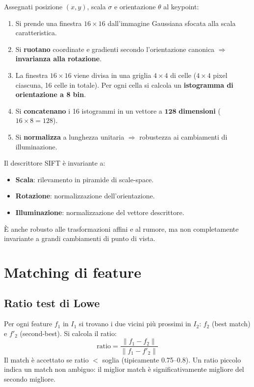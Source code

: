 \documentclass[12pt, a4paper]{report}
\begin{document}
Assegnati posizione $(x,y)$, scala $\sigma$ e orientazione $\theta$ al keypoint:

\begin{enumerate}
  \item Si prende una finestra $16\times16$ dall'immagine Gaussiana sfocata alla
        scala caratteristica.
  \item Si \textbf{ruotano} coordinate e gradienti secondo l'orientazione canonica
        $\Rightarrow$ \textbf{invarianza alla rotazione}.
  \item La finestra $16\times16$ viene divisa in una griglia $4\times4$ di celle
        ($4\times4$ pixel ciascuna, 16 celle in totale). Per ogni cella si calcola
        un \textbf{istogramma di orientazione a 8 bin}.
  \item Si \textbf{concatenano} i 16 istogrammi in un vettore a
        $\mathbf{128}$ \textbf{dimensioni} ($16\times8=128$).
  \item Si \textbf{normalizza} a lunghezza unitaria $\Rightarrow$ robustezza ai
        cambiamenti di illuminazione.
\end{enumerate}

\begin{propbox}
Il descrittore SIFT è invariante a:
\begin{itemize}
  \item \textbf{Scala}: rilevamento in piramide di scale-space.
  \item \textbf{Rotazione}: normalizzazione dell'orientazione.
  \item \textbf{Illuminazione}: normalizzazione del vettore descrittore.
\end{itemize}
\`E anche robusto alle trasformazioni affini e al rumore, ma non completamente
invariante a grandi cambiamenti di punto di vista.
\end{propbox}

\section{Matching di feature}

\subsection{Ratio test di Lowe}

Per ogni feature $f_1$ in $I_1$ si trovano i due vicini più prossimi in $I_2$:
$f_2$ (best match) e $f'_2$ (second-best). Si calcola il ratio:
\[
  \mathrm{ratio} = \frac{\|f_1-f_2\|}{\|f_1-f'_2\|}
\]
Il match è accettato se ratio $<$ soglia (tipicamente 0.75--0.8). Un ratio piccolo
indica un match non ambiguo: il miglior match è significativamente migliore del
secondo migliore.
\end{document}
